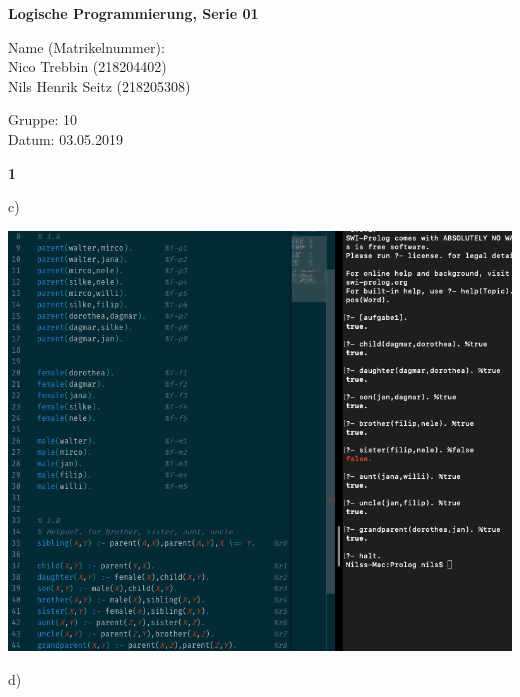 \documentclass[11pt]{article}
\begin{document}
\begin{center}
\textbf{Logische Programmierung, Serie 01}
\end{center}

\begin{flushleft}
Name (Matrikelnummer): \\
Nico Trebbin (218204402)\\
Nils Henrik Seitz (218205308)\\
\end{flushleft}

\begin{flushleft}
Gruppe:	10 \\
Datum: 03.05.2019\\
\end{flushleft}


\begin{flushleft}
\textbf{1}
\end{flushleft}
\begin{flushleft}
 c)
 \end{flushleft} 
\begin{center}
\includegraphics [scale=0.5]{1c}
\end{center}
\newpage
\begin{flushleft}
 d)
 \end{flushleft} 
\end{document}
